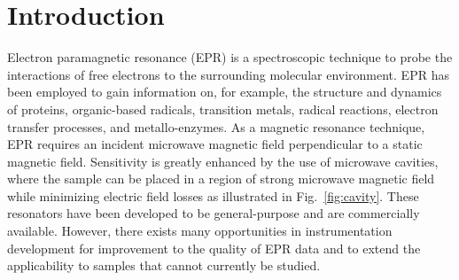 \chapter[Introduction]{Introduction}

Electron paramagnetic resonance (EPR) is a spectroscopic technique to probe the interactions of free electrons to the surrounding molecular environment. EPR has been employed to gain information on, for example, the structure and dynamics of proteins, organic-based radicals, transition metals, radical reactions, electron transfer processes, and metallo-enzymes. As a magnetic resonance technique, EPR requires an incident microwave magnetic field perpendicular to a static magnetic field.\cite{weil2007electron} Sensitivity is greatly enhanced by the use of microwave cavities, where the sample can be placed in a region of strong microwave magnetic field while minimizing electric field losses as illustrated in Fig.~\ref{fig:cavity}. These resonators have been developed to be general-purpose and are commercially available. However, there exists many opportunities in instrumentation development for improvement to the quality of EPR data and to extend the applicability to samples that cannot currently be studied. 

